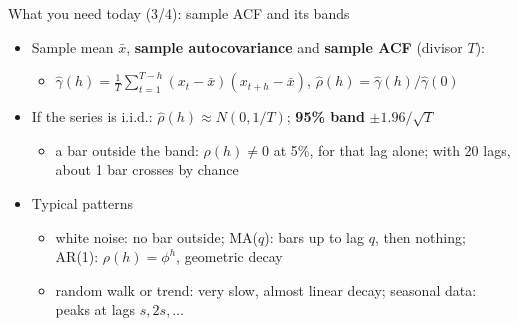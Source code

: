 \begin{frame}{What you need today (3/4): sample ACF and its bands}
\itemsize{\small}
\begin{itemize}
    \item Sample mean $\bar x$, \textbf{sample autocovariance} and \textbf{sample ACF} (divisor $T$):
    \begin{itemize}
        \item $\hat\gamma(h) = \frac1T\sum_{t=1}^{T-h}(x_t - \bar x)(x_{t+h} - \bar x)$, \quad $\hat\rho(h) = \hat\gamma(h)/\hat\gamma(0)$
    \end{itemize}
    \item If the series is i.i.d.: $\hat\rho(h) \approx N(0, 1/T)$; \textbf{95\% band} $\pm 1.96/\sqrt{T}$
    \begin{itemize}
        \item a bar outside the band: $\rho(h) \ne 0$ at 5\%, for that lag alone; with 20 lags, about 1 bar crosses by chance
    \end{itemize}
    \item Typical patterns
    \begin{itemize}
        \item white noise: no bar outside; MA($q$): bars up to lag $q$, then nothing; AR(1): $\rho(h) = \phi^h$, geometric decay
        \item random walk or trend: very slow, almost linear decay; seasonal data: peaks at lags $s, 2s, \dots$
    \end{itemize}
\end{itemize}
\end{frame}

